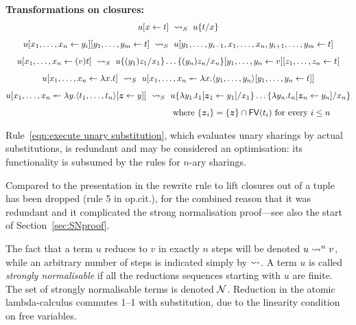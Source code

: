 \documentclass{llncs} %
\begin{document}
\noindent
{\bf Transformations on closures:}
%
\begin{gather}
\label{eqn:execute unary substitution}
	u\share*xt~\ALnotbeta~u\sub xt
\\[5pt]
\label{eqn:compound sharings}
	u\share x{y_i}\share[m]yt ~\ALnotbeta~	%
	u\share*{y_1,\dots,y_{i-1},x_1,\dots,x_n,y_{i+1},\dots,y_m}{t}
\\[5pt]
\label{eqn:share application}
	u\share x{(v)t}~\ALnotbeta~
		u\sub{x_1}{(y_1)z_1}\ldots\sub{x_n}{(y_n)z_n}\share yv\share zt
\\[5pt]
\label{eqn:share abstraction}
	u\share x{\lambda x.t}~\ALnotbeta~ u\distr xx{\tup y\share yt}
\\[5pt]\notag
	u\distr xy{\tup t\share*{\vv*z}{y}}~\ALnotbeta~
	u\sub{x_1}{\lambda y_1.t_1\share*{\vv*z_1}{y_1}}\dotso\sub{x_n}{\lambda y_n.t_n\share*{\vv*z_n}{y_n}}
\\[5pt]
	\rule{6cm}{0pt}\mbox{where } \{\vv*z_i\} = \{\vv*z\}\cap\FV(t_i) \mbox{ for every }i\leq n
\label{eqn:distributor elimination}
\end{gather}

%

\begin{remark}
Rule~\eqref{eqn:execute unary substitution}, which evaluates unary sharings by actual substitutions, is redundant and may be considered an optimisation: its functionality is subsumed by the rules for $n$-ary sharings.
\end{remark}

\begin{remark}
Compared to the presentation in \cite{Gundersen-Heijltjes-Parigot-2013-JFLA,Gundersen-Heijltjes-Parigot-2013-LICS} the rewrite rule to lift closures out of a tuple has been dropped (rule 5 in op.cit.), for the combined reason that it was redundant and it complicated the strong normalisation proof---see also the start of Section~\ref{sec:SNproof}.
\end{remark}


The fact that a term $u$ reduces to $v$ in exactly $n$ steps will be denoted $u \rewrite^n v$, while an arbitrary number of steps is indicated simply by $\rewrite$.
%
A term $u$ is called \emph{strongly normalisable} if all the reductions sequences starting with $u$ are finite.
%
The set of strongly normalisable terms is denoted $\mathcal{N}$.
%
Reduction in the atomic lambda-calculus commutes 1--1 with substitution, due to the linearity condition on free variables.
\end{document}
